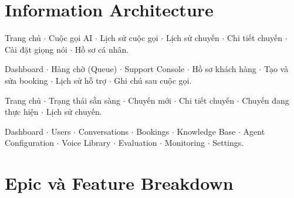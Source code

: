 \documentclass[12pt,a4paper]{article}
\begin{document}
\section{Information Architecture}

\begin{description}[leftmargin=2em]
  \item[Customer Portal:] Trang chủ $\cdot$ Cuộc gọi AI $\cdot$ Lịch sử cuộc gọi $\cdot$ Lịch sử chuyến $\cdot$ Chi tiết chuyến $\cdot$ Cài đặt giọng nói $\cdot$ Hồ sơ cá nhân.
  \item[Operator Console:] Dashboard $\cdot$ Hàng chờ (Queue) $\cdot$ Support Console $\cdot$ Hồ sơ khách hàng $\cdot$ Tạo và sửa booking $\cdot$ Lịch sử hỗ trợ $\cdot$ Ghi chú sau cuộc gọi.
  \item[Driver Portal:] Trang chủ $\cdot$ Trạng thái sẵn sàng $\cdot$ Chuyến mới $\cdot$ Chi tiết chuyến $\cdot$ Chuyến đang thực hiện $\cdot$ Lịch sử chuyến.
  \item[Admin \& AI Ops:] Dashboard $\cdot$ Users $\cdot$ Conversations $\cdot$ Bookings $\cdot$ Knowledge Base $\cdot$ Agent Configuration $\cdot$ Voice Library $\cdot$ Evaluation $\cdot$ Monitoring $\cdot$ Settings.
\end{description}

\section{Epic và Feature Breakdown}
\end{document}
